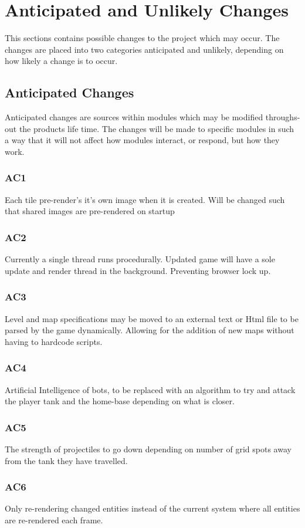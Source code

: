 \documentclass{article}
\begin{document}
\section{Anticipated and Unlikely Changes}
This sections contains possible changes to the project which may occur. The changes are placed into two categories anticipated and unlikely, depending on how likely a change is to occur.

\subsection{Anticipated Changes}
Anticipated changes are sources within modules which may be modified throughs-out the products life time. The changes will be made to specific modules in such a way that it will not affect how modules interact, or respond, but how they work.
\subsubsection*{AC1}
Each tile pre-render's it's own image when it is created. Will be changed such that shared images are pre-rendered on startup
\subsubsection*{AC2}
Currently a single thread runs procedurally. Updated game will have a sole update and render thread in the background. Preventing browser lock up.
\subsubsection*{AC3}
Level and map specifications may be moved to an external text or Html file to be parsed by the game dynamically. Allowing for the addition of new maps without having to hardcode scripts.
\subsubsection*{AC4}
Artificial Intelligence of bots, to be replaced with an algorithm to try and attack the player tank and the home-base depending on what is closer. 
\subsubsection*{AC5}
The strength of projectiles to go down depending on number of grid spots away from the tank they have travelled.
\subsubsection*{AC6}
Only re-rendering changed entities instead of the current system where  all entities are re-rendered each frame.
\end{document}
